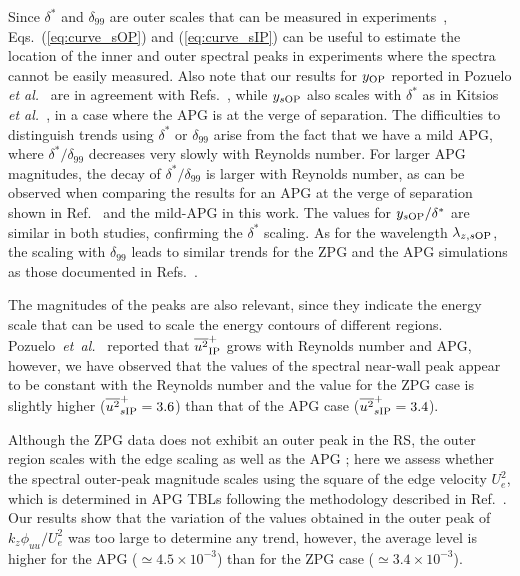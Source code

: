 Since $\delta^*$ and $\delta_{99}$ are outer scales that can be measured in experiments~\cite{diagnostic_Vinuesa}, Eqs.~(\ref{eq:curve_sOP}) and (\ref{eq:curve_sIP}) can be useful to estimate the location of the inner and outer spectral peaks in experiments where the spectra cannot be easily measured. Also note that our results for $y_{\rm OP}$ reported in Pozuelo {\it et al.}~\cite{Pozuelo_JFM_22} are in agreement with Refs.~\cite{Kitsios2017, Maciel_2018, Sanmiguel_PRF}, while $y_{s \rm OP}$ also scales with $\delta^*$ as in Kitsios {\it et al.}~\cite{Kitsios2017}, in a case where the APG is at the verge of separation. The difficulties to distinguish trends using $\delta^*$ or $\delta_{99}$ arise from the fact that we have a mild APG, where $\delta^*/\delta_{99}$ decreases very slowly with Reynolds number.
For larger APG magnitudes, the decay of $\delta^*/\delta_{99}$ is larger with Reynolds number, as can be observed when comparing the results for an APG at the verge of separation shown in Ref.~\cite{Kitsios2017} and the mild-APG in this work. The values for $y_{s \rm OP}/\delta^*$ are similar in both studies, confirming the $\delta^*$ scaling.
As for the wavelength $\lambda_{z,s \rm OP}$, the scaling with $\delta_{99}$ leads to similar trends for the ZPG and the APG simulations as those documented in Refs.~\cite{Lee2017, bobke2017}.

The magnitudes of the peaks are also relevant, since they indicate the energy scale that can be used to scale the energy contours of different regions.
Pozuelo~{\it et~al.}~\cite{Pozuelo_JFM_22} reported that $\overline{u^2}^+_{\rm IP}$ grows with Reynolds number and APG, however, we have observed that the values of the spectral near-wall peak appear to be constant with the Reynolds number and the value for the ZPG case is slightly higher ($\overline{u^2}^+_{s \rm IP}=3.6$) than that of the APG case ($\overline{u^2}^+_{s \rm IP}=3.4$).

Although the ZPG data does not exhibit an outer peak in the RS, the outer region scales with the edge scaling as well as the APG \cite{Pozuelo_JFM_22}; here we assess whether the spectral outer-peak magnitude scales using the square of the edge velocity $U_{e}^2$, 
which is determined in APG TBLs following the methodology described in Ref.~\cite{diagnostic_Vinuesa}.
Our results show that the variation of the values obtained in the outer peak of $k_z\phi_{uu}/U_e^2$ was too large to determine any trend, however, the average level is higher for the APG ($\simeq 4.5 \times 10^{-3}$) than for the ZPG case ($\simeq 3.4 \times 10^{-3}$).

